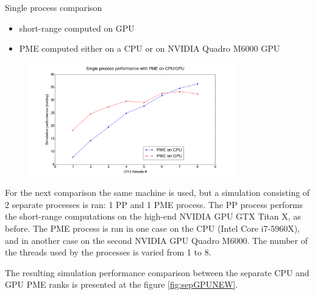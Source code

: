 \documentclass[11pt]{beamer}
\begin{document}
\begin{frame}{Single process comparison}
\begin{itemize}
\item short-range computed on GPU
\item PME computed either on a CPU or on NVIDIA Quadro M6000 GPU
\end{itemize}
\FloatBarrier
\begin{figure} [h!]
    \centering
    \includegraphics[width=0.8\textwidth]{pics/CPU_GPU_ADH_SINGLE.png}
\end{figure}
\FloatBarrier
\end{frame}



For the next comparison the same machine is used, but a simulation consisting of 2 separate processes is ran: 1 PP and 1 PME process. The PP process performs the short-range computations on the high-end NVIDIA GPU GTX Titan X, as before.    
The PME process is ran in one case on the CPU (Intel Core i7-5960X), and in another case on the second NVIDIA GPU Quadro M6000. The number of the threads used by the processes is varied from 1 to 8.
 
The resulting simulation performance comparison between the separate CPU and GPU PME ranks is presented at the figure \ref{fig:sepGPUNEW}.
 
\end{document}
